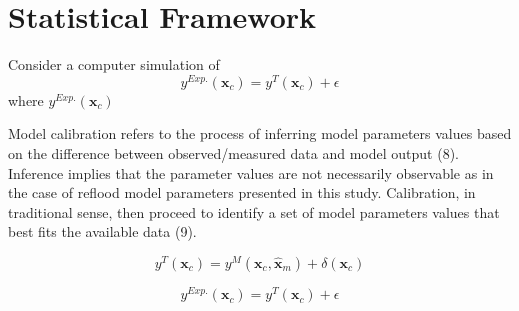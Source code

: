 \section{Statistical Framework}\label{sec:bc_statistical_framework}

Consider a computer simulation of 
\begin{equation}
    y^{Exp.}(\bm{x}_c) = y^T (\bm{x}_c) + \epsilon
\label{eq:bc_computer_model}
\end{equation}
where $y^{Exp.}(\bm{x}_c)$


Model calibration refers to the process of inferring model parameters values based on the difference between observed/measured data and model output (8).
Inference implies that the parameter values are not necessarily observable as in the case of reflood model parameters presented in this study.
Calibration, in traditional sense, then proceed to identify a set of model parameters values that best fits the available data (9).






\begin{equation}
    y^T(\bm{x}_c) = y^M (\bm{x}_c, \bm{\hat{x}}_m) + \delta(\bm{x}_c)
\label{eq:bc_koh_true_model}
\end{equation}

\begin{equation}
    y^{Exp.}(\bm{x}_c) = y^T (\bm{x}_c) + \epsilon
\label{eq:bc_koh_true_measured}
\end{equation}



